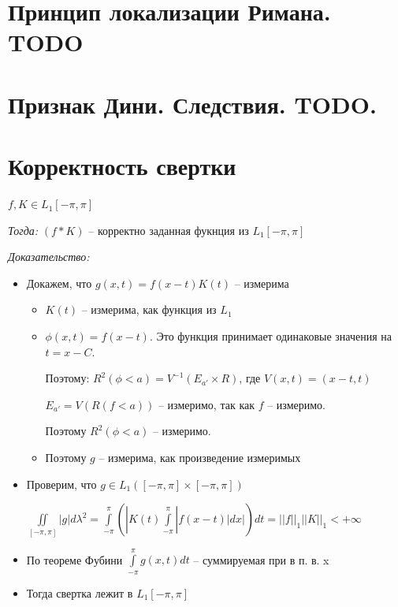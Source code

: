 \documentclass[paper=a4, fontsize=17pt]{article}
\begin{document}
\section{Принцип локализации Римана. TODO}

\section{Признак Дини. Следствия. TODO.}

\section{Корректность свертки}

$ f, K \in L_1[-\pi, \pi] $

\emph{Тогда:} $ (f * K)$ -- корректно заданная фукнция из $ L_1[-\pi, \pi] $

\emph{Доказательство:}

\begin{itemize}
	\item Докажем, что $ g(x, t) = f(x - t)K(t) $ -- измерима
		\begin{itemize}
			\item $ K(t) $ -- измерима, как функция из $ L_1 $
			\item $ \phi(x, t) = f(x - t) $. Это функция принимает одинаковые значения на $ t = x - C $.

			Поэтому: $ R^2(\phi < a) = V^{-1}(E_{a'} \times R)$, где $ V(x, t) = (x - t, t) $

			$ E_{a'} = V(R(f < a)) $ -- измеримо, так как $ f $ -- измеримо.

			Поэтому $ R^2(\phi < a) $ -- измеримо.
			\item Поэтому $ g $ -- измерима, как произведение измеримых
		\end{itemize}

	\item Проверим, что $ g \in L_1([-\pi, \pi]\times[-\pi, \pi]) $

		$ \iint\limits_{[-\pi, \pi]} | g | d\lambda^2 =
		  \int\limits_{-\pi}^{\pi} (|K(t)  \int\limits_{-\pi}^{\pi} | f(x-t)| dx |) dt =
		  ||f||_1 ||K||_1 < +\infty $
	\item По теореме Фубини $ \int\limits_{-\pi}^{\pi} g(x, t) dt $ -- суммируемая при в п. в. x

	\item Тогда свертка лежит в $ L_1[-\pi, \pi] $


\end{itemize}
\end{document}
